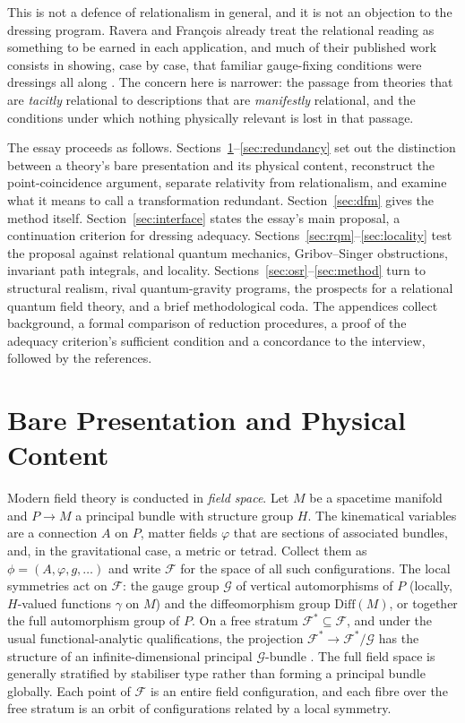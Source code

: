 \documentclass[11pt]{article}
\theoremstyle{plain}
\theoremstyle{definition}
\theoremstyle{remark}
\newcommand{\F}{\mathcal F}
\newcommand{\G}{\mathcal G}
\newcommand{\Diff}{\mathrm{Diff}}
\begin{document}
This is not a defence of relationalism in general, and it is not an objection to the dressing program. Ravera and François already treat the relational reading as something to be earned in each application, and much of their published work consists in showing, case by case, that familiar gauge-fixing conditions were dressings all along \cite{fr-rs,fr-unconv,fr-offshell}. The concern here is narrower: the passage from theories that are \emph{tacitly} relational to descriptions that are \emph{manifestly} relational, and the conditions under which nothing physically relevant is lost in that passage.

The essay proceeds as follows. Sections~\ref{sec:bare}--\ref{sec:redundancy} set out the distinction between a theory's bare presentation and its physical content, reconstruct the point-coincidence argument, separate relativity from relationalism, and examine what it means to call a transformation redundant. Section~\ref{sec:dfm} gives the method itself. Section~\ref{sec:interface} states the essay's main proposal, a continuation criterion for dressing adequacy. Sections~\ref{sec:rqm}--\ref{sec:locality} test the proposal against relational quantum mechanics, Gribov--Singer obstructions, invariant path integrals, and locality. Sections~\ref{sec:osr}--\ref{sec:method} turn to structural realism, rival quantum-gravity programs, the prospects for a relational quantum field theory, and a brief methodological coda. The appendices collect background, a formal comparison of reduction procedures, a proof of the adequacy criterion's sufficient condition and a concordance to the interview, followed by the references.

\section{Bare Presentation and Physical Content}\label{sec:bare}

Modern field theory is conducted in \emph{field space}. Let $M$ be a spacetime manifold and $P\to M$ a principal bundle with structure group $H$. The kinematical variables are a connection $A$ on $P$, matter fields $\varphi$ that are sections of associated bundles, and, in the gravitational case, a metric or tetrad. Collect them as $\phi=(A,\varphi,g,\dots)$ and write $\F$ for the space of all such configurations. The local symmetries act on $\F$: the gauge group $\G$ of vertical automorphisms of $P$ (locally, $H$-valued functions $\gamma$ on $M$) and the diffeomorphism group $\Diff(M)$, or together the full automorphism group of $P$. On a free stratum $\F^*\subseteq\F$, and under the usual functional-analytic qualifications, the projection $\F^*\to\F^*/\G$ has the structure of an infinite-dimensional principal $\G$-bundle \cite{fr-grf,ravera-notes}. The full field space is generally stratified by stabiliser type rather than forming a principal bundle globally. Each point of $\F$ is an entire field configuration, and each fibre over the free stratum is an orbit of configurations related by a local symmetry.
\end{document}
